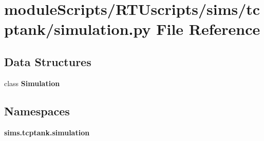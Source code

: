 \section{module\+Scripts/\+R\+T\+Uscripts/sims/tcptank/simulation.py File Reference}
\label{tcptank_2simulation_8py}
\subsection*{Data Structures}
\begin{DoxyCompactItemize}
\item 
class {\bf Simulation}
\end{DoxyCompactItemize}
\subsection*{Namespaces}
\begin{DoxyCompactItemize}
\item 
 {\bf sims.\+tcptank.\+simulation}
\end{DoxyCompactItemize}
